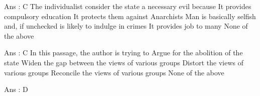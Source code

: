         Ans : C
        The individualist consider the state a necessary evil because
            It provides compulsory education
            It protects them against Anarchists
            Man is basically selfish and, if unchecked is likely to indulge in crimes
            It provides job to many
            None of the above 

        Ans : C
        In this passage, the author is trying to
            Argue for the abolition of the state
            Widen the gap between the views of various groups
            Distort the views of various groups
            Reconcile the views of various groups
            None of the above 

        Ans : D 
